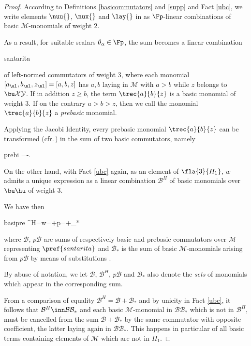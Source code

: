 \begin{proof}
According to Definitions \ref{basicommutators} and \ref{supp} and Fact \ref{ubc},
we write elements $\nuu{}$, $\nux{}$ and $\lay{}$ in  as $\Fp$-linear combinations
of basic $\mathcal{M}$-monomials of weight $2$.

As a result, for suitable scalars $\theta_{\alpha}\in\Fp$, the sum  becomes a linear combination
\begin{labeq}{santarita}
\summ{\al}{\theta_{\al}}{[a_{\al},b_{\al},z_{\al}]}
\end{labeq}
of left-normed commutators of weight $3$, where each monomial $[a_{\al},b_{\al},z_{\al}]=[a,b,z]$ has
$a,b$ laying in $\mathcal{M}$ with $a>b$ while $z$ belongs to $\bu\mathcal{X}\mathcal{Y}$.
If in addition $z\geq b$, the term $\trec{a}{b}{z}$ is a basic monomial of weight $3$.
If on the contrary $a>b>z$, then we call the monomial $\trec{a}{b}{z}$ a \emph{prebasic} monomial.

Applying the Jacobi Identity, every prebasic monomial $\trec{a}{b}{z}$ can be transformed (cfr.\,\cite[p.577]{mhalll})
in the sum of two basic commutators, namely
\begin{labeq}{prebi}
=-.
\end{labeq}

On the other hand, with Fact \ref{ubc} again, as an element of $\fla{3}{H_1}$, %
$w$ admits a unique expression as a linear combination $\mathcal{B}^H$ of basic monomials over $\bu\hu$ of weight $3$.

We have then
\begin{labeq}{basipre}
^H=w=+p=+_*
\end{labeq}
where $\mathcal{B}$, $p\mathcal{B}$ are sums of respectively basic and prebasic commutators over $\mathcal{M}$
representing $\pref{santarita}$ and $\mathcal{B}_{*}$ is the sum of basic $\mathcal{M}$-monomials arising from $p\mathcal{B}$
by means of substitutions .

By abuse of notation, we let $\mathcal{B}$, $\mathcal{B}^{H}$, $p\mathcal{B}$ and $\mathcal{B}_{*}$ also denote the {\em sets} of
monomials which appear in the corresponding sum.

From a comparison of equality $\mathcal{B}^{H}=\mathcal{B}+\mathcal{B}_{*}$ %
and by unicity in Fact \ref{ubc}, it follows that 
$\mathcal{B}^{H}\inn \mathcal{B}\mathcal{B}_{*}$ and
each basic $\mathcal{M}$-monomial in $\mathcal{B}\mathcal{B}_{*}$ which is not in $\mathcal{B}^{H}$, must be cancelled
from the sum $\mathcal{B}+\mathcal{B}_{*}$ by the same commutator with opposite coefficient,
the latter laying again in $\mathcal{B}\mathcal{B}_{*}$.
This happens in particular of all basic terms containing elements of $\mathcal{M}$ which are not in $H_1$.


\end{proof}
